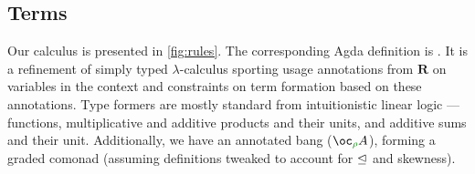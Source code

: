\documentclass[submission,copyright,creativecommons]{eptcs}
\begin{document}
\subsection{Terms}

Our calculus is presented in \autoref{fig:rules}.
The corresponding Agda definition is .
It is a refinement of simply typed $\lambda$-calculus sporting usage annotations
from $\mathbf R$ on variables in the context and constraints on term formation
based on these annotations.
Type formers are mostly standard from intuitionistic linear logic --- functions,
multiplicative and additive products and their units, and additive sums and
their unit.
Additionally, we have an annotated bang ($\excl{\rho}{A}$), forming a graded
comonad (assuming definitions tweaked to account for $\trianglelefteq$ and skewness).
\end{document}
